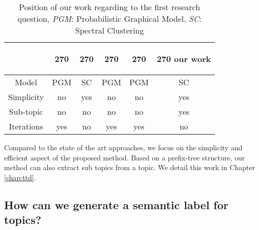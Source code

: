     \begin{table}[htp]
        \centering
        \begin{tabular}{c c c c c c}
        &
        \begin{turn}{270}
            \cite{blei2003latent} \end{turn} 
        &
        \begin{turn}{270} 
            \cite{Chang:2013} 
        \end{turn}
        &
        \begin{turn}{270} 
            \cite{yang2013cqarank}
        \end{turn}
        &
        \begin{turn}{270}
            \cite{hu2014user}
        \end{turn}
        &
        \begin{turn}{270}
        our work
        \end{turn}
        \\ \hline
        Model & PGM & SC & PGM & PGM & SC\\ \hline
        Simplicity & no & yes & no & no & yes\\ \hline
        Sub-topic & no & no & no & no &  yes \\ \hline
        Iterations & yes & no & yes& yes & no \\ \hline
        
        \end{tabular}
        \caption{Position of our work regarding to the first research question, \textit{PGM}: Probabilistic Graphical Model, \textit{SC}: Spectral Clustering}
        \label{tab:rq2compare}
    \end{table}
Compared to the state of the art approaches, we focus on the simplicity and efficient aspect of the proposed method. Based on a prefix-tree structure, our method can also extract sub topics from a topic. We detail this work in Chapter \ref{chap:ttd}.
    
    
    
\subsection{How can we generate a semantic label for topics?}



